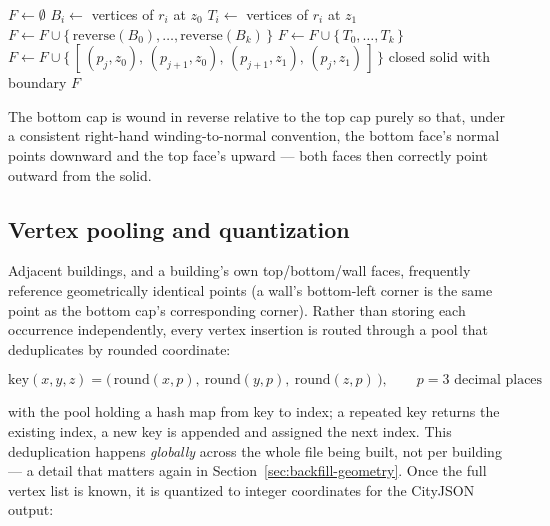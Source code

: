 \documentclass[11pt]{article}
\begin{document}
\begin{algorithm}[H]
\caption{Footprint $\to$ LoD1 solid}
\label{alg:extrude}
\begin{algorithmic}[1]
  \State $F \gets \emptyset$ 
    \State $B_i \gets$ vertices of $r_i$ at $z_0$
    \State $T_i \gets$ vertices of $r_i$ at $z_1$
  \EndFor
  \State $F \gets F \cup \{\,\mathrm{reverse}(B_0), \dots, \mathrm{reverse}(B_k)\,\}$
  \State $F \gets F \cup \{\,T_0, \dots, T_k\,\}$ 
      \State $F \gets F \cup \{\,[\,(p_j,z_0),\,(p_{j+1},z_0),\,(p_{j+1},z_1),\,(p_j,z_1)\,]\,\}$
    \EndFor
  \EndFor
  \State \Return closed solid with boundary $F$
\EndFunction
\end{algorithmic}
\end{algorithm}

The bottom cap is wound in reverse relative to the top cap purely so that, under a consistent
right-hand winding-to-normal convention, the bottom face's normal points downward and the top
face's upward --- both faces then correctly point outward from the solid.

\subsection{Vertex pooling and quantization}

Adjacent buildings, and a building's own top/bottom/wall faces, frequently reference
geometrically identical points (a wall's bottom-left corner is the same point as the bottom
cap's corresponding corner). Rather than storing each occurrence independently, every vertex
insertion is routed through a pool that deduplicates by rounded coordinate:

\begin{equation}
  \mathrm{key}(x,y,z) = \big(\,\mathrm{round}(x,p),\ \mathrm{round}(y,p),\ \mathrm{round}(z,p)\,\big), \qquad p = 3 \text{ decimal places}
\end{equation}

with the pool holding a hash map from key to index; a repeated key returns the existing index,
a new key is appended and assigned the next index. This deduplication happens \emph{globally}
across the whole file being built, not per building --- a detail that matters again in
Section~\ref{sec:backfill-geometry}. Once the full vertex list is known, it is quantized to
integer coordinates for the CityJSON output:
\end{document}
